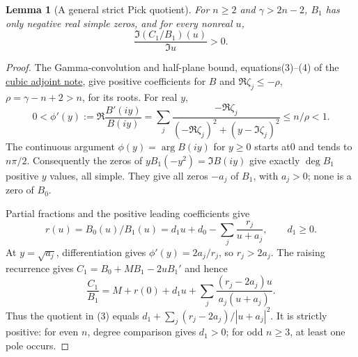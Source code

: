 \documentclass[11pt]{article}
\newtheorem{lemma}{Lemma}
\begin{document}
\begin{lemma}[A general strict Pick quotient]\label{lem:pick-general}
For $n\ge2$ and $\gamma>2n-2$, $B_1$ has only negative real
simple zeros, and for every nonreal $u$,
\[
 \frac{\Im(C_1/B_1)(u)}{\Im u}>0.                      \tag{3}
\]
\end{lemma}
\begin{proof}
The Gamma-convolution and half-plane bound, equations(3)--(4) of the
\href{CUBIC_ADJOINT_STABILITY_SFC.tex}{cubic adjoint note},
give positive coefficients for $B$ and
$\Re\zeta_j\le-\rho$, $\rho=\gamma-n+2>n$, for its roots.
For real $y$,
\[
 0<\phi'(y):=\Re\frac{B'(iy)}{B(iy)}
   =\sum_j\frac{-\Re\zeta_j}
      {(-\Re\zeta_j)^2+(y-\Im\zeta_j)^2}
 \le n/\rho<1.
\]
The continuous argument $\phi(y)=\arg B(iy)$ for $y\ge0$
starts at0 and tends to $n\pi/2$.
Consequently the zeros of $yB_1(-y^2)=\Im B(iy)$ give exactly
$\deg B_1$ positive $y$ values, all simple.
They give all zeros $-a_j$ of $B_1$, with $a_j>0$;
none is a zero of $B_0$.

Partial fractions and the positive leading coefficients give
\[
 r(u)=B_0(u)/B_1(u)=d_1u+d_0-\sum_j\frac{r_j}{u+a_j},
 \qquad d_1\ge0.
\]
At $y=\sqrt{a_j}$, differentiation gives
$\phi'(y)=2a_j/r_j$, so $r_j>2a_j$.
The raising recurrence gives
$C_1=B_0+MB_1-2uB_1'$ and hence
\[
 \frac{C_1}{B_1}
 =M+r(0)+d_1u+
       \sum_j\frac{(r_j-2a_j)u}{a_j(u+a_j)}.
\]
Thus the quotient in (3) equals
$d_1+\sum_j(r_j-2a_j)/|u+a_j|^2$.
It is strictly positive: for even $n$, degree comparison gives
$d_1>0$; for odd $n\ge3$, at least one pole occurs.
\end{proof}
\end{document}
